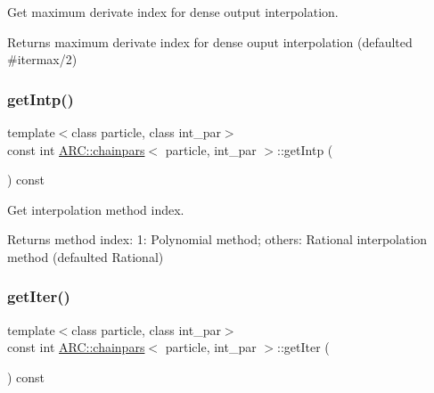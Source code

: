 Get maximum derivate index for dense output interpolation. 

\begin{DoxyReturn}{Returns}
maximum derivate index for dense ouput interpolation (defaulted \#itermax/2) 
\end{DoxyReturn}
\hypertarget{classARC_1_1chainpars_a83cbe423a9f64c3985b16bad8b9a601c}{}\label{classARC_1_1chainpars_a83cbe423a9f64c3985b16bad8b9a601c} 
\subsubsection{\texorpdfstring{get\+Intp()}{getIntp()}}
{\footnotesize\ttfamily template$<$class particle, class int\+\_\+par$>$ \\
const int \hyperlink{classARC_1_1chainpars}{A\+R\+C\+::chainpars}$<$ particle, int\+\_\+par $>$\+::get\+Intp (\begin{DoxyParamCaption}{ }\end{DoxyParamCaption}) const\hspace{0.3cm}{\ttfamily [inline]}}



Get interpolation method index. 

\begin{DoxyReturn}{Returns}
method index\+: 1\+: Polynomial method; others\+: Rational interpolation method (defaulted Rational) 
\end{DoxyReturn}
\hypertarget{classARC_1_1chainpars_acabcaa74a61c1d7304e1206f985ec3e9}{}\label{classARC_1_1chainpars_acabcaa74a61c1d7304e1206f985ec3e9} 
\subsubsection{\texorpdfstring{get\+Iter()}{getIter()}}
{\footnotesize\ttfamily template$<$class particle, class int\+\_\+par$>$ \\
const int \hyperlink{classARC_1_1chainpars}{A\+R\+C\+::chainpars}$<$ particle, int\+\_\+par $>$\+::get\+Iter (\begin{DoxyParamCaption}{ }\end{DoxyParamCaption}) const\hspace{0.3cm}{\ttfamily [inline]}}



